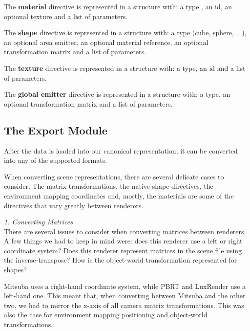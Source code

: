 The \textbf{material} directive is represented in a structure with: a type , an
id, an optional texture and a list of parameters.

The \textbf{shape} directive is represented in a structure with: a type (cube,
sphere, ...), an optional area emitter, an optional material reference, an
optional transformation matrix and a list of parameters.

The \textbf{texture} directive is represented in a structure with: a type, an id and a list of parameters. 

The \textbf{global emitter} directive is represented in a structure with: a
type, an optional transformation matrix and a list of parameters.

\subsection{The Export Module}
After the data is loaded into our canonical
representation, it can be converted into any of the supported formats.

When converting scene representations, there are several delicate cases to
consider. The matrix transformations, the native shape
directives, the environment mapping coordinates and, mostly, the materials are
some of the directives that vary greatly between renderers. 

\textit{1. Converting Matrices} \\
There are several issues to consider when converting matrices between renderers.
A few things we had to keep in mind were: does this renderer use a left or right
coordinate system? Does this renderer represent matrices in the scene file using
the inverse-transpose? How is the object-world transformation represented for
shapes?

Mitsuba uses a right-hand coordinate system, while PBRT and LuxRender use a
left-hand one. This meant that, when converting between Mitsuba and the other
two, we had to mirror the x-axis of all camera matrix transformations. This was
also the case for environment mapping positioning and object-world
transformations.



